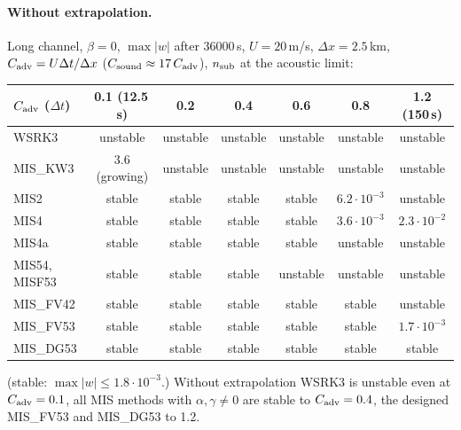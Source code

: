 \documentclass[11pt,a4paper]{article}
\newcommand{\dt}{\Delta t}
\begin{document}
\paragraph{Without extrapolation.} Long channel, $\beta=0$, $\max|w|$ after 36000\,s, $U=20$\,m/s,
$\Delta x=2.5$\,km, $C_{\rm adv}=U\dt/\Delta x$ ($C_{\rm sound}\approx17\,C_{\rm adv}$), $n_{\rm sub}$ at the
acoustic limit:
\begin{center}\small\setlength{\tabcolsep}{4pt}\begin{tabular}{lcccccc}\toprule
$C_{\rm adv}$ ($\dt$) & 0.1 (12.5\,s) & 0.2 & 0.4 & 0.6 & 0.8 & 1.2 (150\,s)\\\midrule
WSRK3 & unstable & unstable & unstable & unstable & unstable & unstable\\
MIS\_KW3 & 3.6 (growing) & unstable & unstable & unstable & unstable & unstable\\
MIS2 & stable & stable & stable & stable & $6.2\cdot10^{-3}$ & unstable\\
MIS4 & stable & stable & stable & stable & $3.6\cdot10^{-3}$ & $2.3\cdot10^{-2}$\\
MIS4a & stable & stable & stable & stable & unstable & unstable\\
MIS54, MISF53 & stable & stable & stable & unstable & unstable & unstable\\
MIS\_FV42 & stable & stable & stable & stable & stable & unstable\\
MIS\_FV53 & stable & stable & stable & stable & stable & $1.7\cdot10^{-3}$\\
MIS\_DG53 & stable & stable & stable & stable & stable & stable\\\bottomrule
\end{tabular}\end{center}
(stable: $\max|w|\le1.8\cdot10^{-3}$.) Without extrapolation WSRK3 is unstable even at $C_{\rm adv}=0.1$,
all MIS methods with $\alpha,\gamma\neq0$ are stable to $C_{\rm adv}=0.4$, the designed MIS\_FV53 and
MIS\_DG53 to 1.2.
\end{document}
